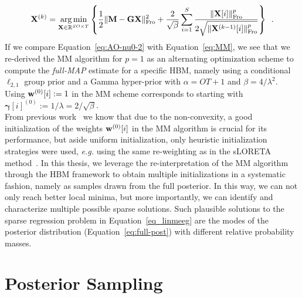 \begin{equation} \label{eq:AO-nu0-2}
\mathbf{X}^{(k)} = \mathop{\mathrm{arg}\,\mathrm{min}}_{\mathbf{X}\in\mathbb{R}^{SO \times T}} \left\lbrace \frac{1}{2} \|{\mathbf{M} -\mathbf{G} \mathbf{X}}\|_{\rm Fro}^2 + \frac{2}{\sqrt{\beta}} \sum_{i=1}^S  \frac{\|{\mathbf{X}[i]}\|_{\rm Fro}^p}{2 \sqrt{\|{\mathbf{X}^{(k-1)}[i]}\|_{\rm Fro}^p}} \right\rbrace \enspace .
\end{equation}
If we compare Equation~\eqref{eq:AO-nu0-2} with Equation~\eqref{eq:MM}, we see that we re-derived the MM algorithm for $p=1$ as an alternating optimization scheme to compute the \emph{full-MAP} estimate for a specific HBM, namely using a conditional $\ell_{2,1}$ group prior and a Gamma hyper-prior with $\alpha = OT + 1$ and $\beta = 4/\lambda^2$. Using $\mathbf{w}^{(0)}[i] := 1$ in the MM scheme corresponds to starting with $\mathbf{\gamma}[i]^{(0)} := 1/\lambda =  2/\sqrt{\beta}$.\\

From previous work~\cite{strohmeier-etal:16} we know that due to the non-convexity, a good initialization of the weights $\mathbf{w}^{(0)}[i]$ in the MM algorithm is crucial for its performance, but aside uniform initialization, only heuristic initialization strategies were used, \textit{e.g.} using the same re-weighting as in the sLORETA method~\cite{Pa02}. In this thesis, we leverage the re-interpretation of the MM algorithm through the HBM framework to obtain multiple initializations in a systematic fashion, namely as samples drawn from the full posterior. In this way, we can not only reach better local minima, but more importantly, we can identify and characterize multiple possible sparse solutions. Such plausible solutions to the sparse regression problem in Equation~\eqref{eq_linmeeg} are the modes of the posterior distribution (Equation~\eqref{eq:full-post}) with different relative probability masses.

\section{Posterior Sampling}
\label{section:hbm_sampling}

